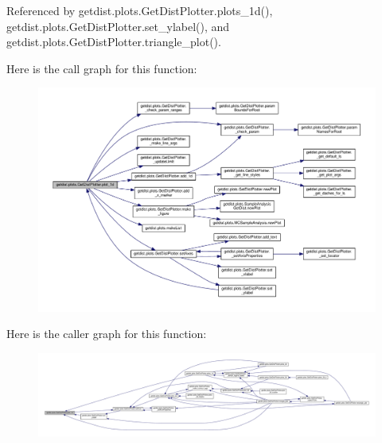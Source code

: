 Referenced by getdist.\+plots.\+Get\+Dist\+Plotter.\+plots\+\_\+1d(), getdist.\+plots.\+Get\+Dist\+Plotter.\+set\+\_\+ylabel(), and getdist.\+plots.\+Get\+Dist\+Plotter.\+triangle\+\_\+plot().

Here is the call graph for this function\+:
\nopagebreak
\begin{figure}[H]
\begin{center}
\leavevmode
\includegraphics[width=350pt]{classgetdist_1_1plots_1_1GetDistPlotter_aab253c97064f41256595e20f5388f86c_cgraph}
\end{center}
\end{figure}
Here is the caller graph for this function\+:
\nopagebreak
\begin{figure}[H]
\begin{center}
\leavevmode
\includegraphics[width=350pt]{classgetdist_1_1plots_1_1GetDistPlotter_aab253c97064f41256595e20f5388f86c_icgraph}
\end{center}
\end{figure}
\mbox{\label{classgetdist_1_1plots_1_1GetDistPlotter_a4a4a4bee3e0232eb2089b2f9b0006909}} 
